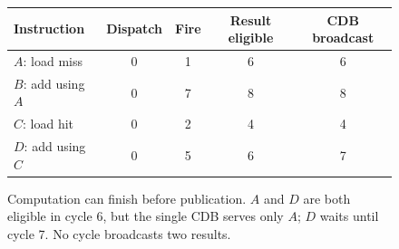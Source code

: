 \begin{figure}[htbp]
  \centering
  \begin{tabular}{lcccc}
    \toprule
    Instruction & Dispatch & Fire & Result eligible & CDB broadcast \\
    \midrule
    $A$: load miss & 0 & 1 & 6 & 6 \\
    $B$: add using $A$ & 0 & 7 & 8 & 8 \\
    $C$: load hit & 0 & 2 & 4 & 4 \\
    $D$: add using $C$ & 0 & 5 & 6 & 7 \\
    \bottomrule
  \end{tabular}
  \par\medskip
  \caption{Computation can finish before publication. $A$ and $D$ are both eligible in cycle 6, but the single CDB serves only $A$; $D$ waits until cycle 7. No cycle broadcasts two results.}
  \label{fig:ilp-tomasulo-cycle-table}
\end{figure}
